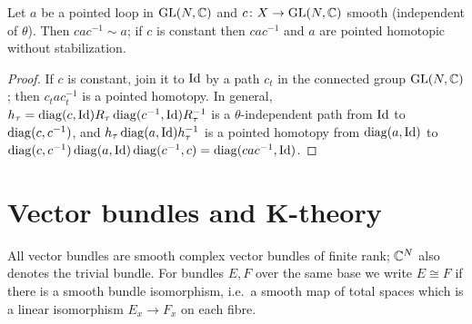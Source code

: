 \begin{lemma}[Conjugation]\label{bott:lem:conjugation}
  Let $a$ be a pointed loop in $\operatorname{GL}(N,\mathbb{C})$ and $c\colon X\to\operatorname{GL}(N,\mathbb{C})$ smooth
  (independent of $\theta$). Then $cac^{-1}\sim a$; if $c$ is constant then
  $cac^{-1}$ and $a$ are pointed homotopic without stabilization.
\end{lemma}
\begin{proof}
  If $c$ is constant, join it to $\operatorname{Id}$ by a path $c_t$ in the connected group
  $\operatorname{GL}(N,\mathbb{C})$; then $c_tac_t^{-1}$ is a pointed homotopy. In general,
  $h_\tau=\operatorname{diag}(c,\operatorname{Id})R_\tau\operatorname{diag}(c^{-1},\operatorname{Id})R_\tau^{-1}$ is a $\theta$-independent
  path from $\operatorname{Id}$ to $\operatorname{diag}(c,c^{-1})$, and
  $h_\tau\operatorname{diag}(a,\operatorname{Id})h_\tau^{-1}$ is a pointed homotopy from $\operatorname{diag}(a,\operatorname{Id})$ to
  $\operatorname{diag}(c,c^{-1})\operatorname{diag}(a,\operatorname{Id})\operatorname{diag}(c^{-1},c)=\operatorname{diag}(cac^{-1},\operatorname{Id})$.
\end{proof}

\section{Vector bundles and K-theory}\label{bott:sec:K}

All vector bundles are smooth complex vector bundles of finite rank; $\mathbb{C}^N$ also
denotes the trivial bundle. For bundles $E,F$ over the same base we write
$E\cong F$ if there is a smooth bundle isomorphism, i.e.\ a smooth map of total spaces
which is a linear isomorphism $E_x\to F_x$ on each fibre.

